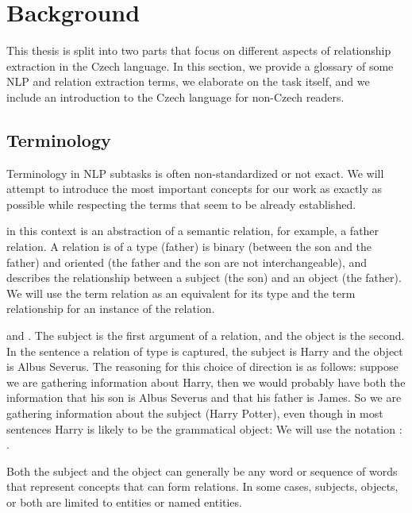 \chapter{Background}

This thesis is split into two parts that focus on different aspects of relationship extraction in the Czech language. In this section, we provide a glossary of some NLP and relation extraction terms, we elaborate on the task itself, and we include an introduction to the Czech language for non-Czech readers.


\section{Terminology}
Terminology in NLP subtasks is often non-standardized or not exact. We will attempt to introduce the most important concepts for our work as exactly as possible while respecting the terms that seem to be already established. 


 in this context is an abstraction of a semantic relation, for example, a father relation. A relation is of a type (father) is binary (between the son and the father) and oriented (the father and the son are not interchangeable), and describes the relationship between a subject (the son) and an object (the father). We will use the term relation as an equivalent for its type and the term relationship for an instance of the relation. 


 and . The subject is the first argument of a relation, and the object is the second. In the sentence  a relation of type  is captured, the subject is Harry and the object is Albus Severus. The reasoning for this choice of direction is as follows: suppose we are gathering information about Harry, then we would probably have both the information that his son is Albus Severus and that his father is James. So we are gathering information about the subject (Harry Potter), even though in most sentences Harry is likely to be the grammatical object:  We will use the notation : . 



Both the subject and the object can generally be any word or sequence of words that represent concepts that can form relations. In some cases, subjects, objects, or both are limited to entities or named entities.

